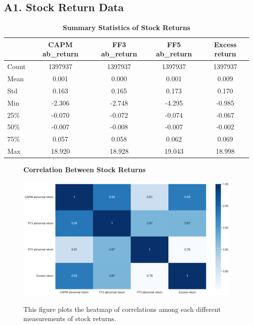 \subsection*{A1. Stock Return Data}\label{sec:appendixa1}

\begin{table}[!ht]
  \centering
  \caption{\textbf{Summary Statistics of Stock Returns}}
  \begin{tabular}{lcccc}
  \hline
      ~ & CAPM ab\_return & FF3 ab\_return & FF5 ab\_return & Excess return \\ \hline
      Count & 1397937 & 1397937 & 1397937 & 1397937 \\ 
      Mean & 0.001 & 0.000 & 0.001 & 0.009 \\ 
      Std & 0.163 & 0.165 & 0.173 & 0.170 \\ 
      Min & -2.306 & -2.748 & -4.295 & -0.985 \\ 
      25\% & -0.070 & -0.072 & -0.074 & -0.067 \\ 
      50\% & -0.007 & -0.008 & -0.007 & -0.002 \\ 
      75\% & 0.057 & 0.058 & 0.062 & 0.069 \\ 
      Max & 18.920 & 18.928 & 19.043 & 18.998 \\ \hline
  \end{tabular}
  \label{table: Summary statistic of return}
\end{table}

\begin{figure}[H]
  \centering
  \caption{\textbf{Correlation Between Stock Returns}}
  \includegraphics[width=.8\textwidth]{images/abnormal_excess_corr.png}
  \label{fig: abnormal_excess_corr}
  \caption*{\footnotesize{This figure plots the heatmap of correlations among each different measurements of stock returns.}}
\end{figure} 

